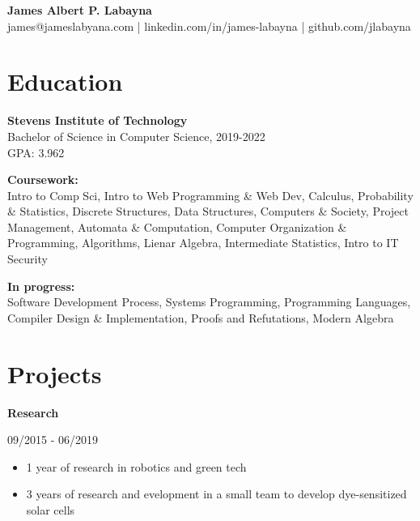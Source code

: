 \documentclass[11pt,letterpaper]{article}
\begin{document}
  \begin{center}
    \textbf{James Albert P. Labayna} \\
    \small james@jameslabyana.com | linkedin.com/in/james-labayna | github.com/jlabayna
  \end{center}
  
  \iffalse
  \begin{minipage}[t]{2in}
    \textbf{Present Address:} \\
    205 Hudson St, Apt. 602 \\
    Hoboken, NJ 07030 \\
    201.256.7526
  \end{minipage}
  \hfill
  \begin{minipage}[t]{2.4in}
    \textbf{Permanent Address:} \\
    294 S. Washington Ave., Apt. 87 \\
    Bergenfield, NJ 07030
  \end{minipage}
  \fi
  
  \section{Education}
    \textbf{Stevens Institute of Technology} \\
    Bachelor of Science in Computer Science, 2019-2022 \\
    GPA: 3.962
    
    \noindent\textbf{Coursework:}\\
    Intro to Comp Sci, Intro to Web Programming \& Web Dev, Calculus, Probability \& Statistics, Discrete Structures, Data Structures, Computers \& Society, Project Management, 
    Automata \& Computation, Computer Organization \& Programming, Algorithms, Lienar Algebra, Intermediate Statistics, Intro to IT Security

    \textbf{In progress:}\\
	Software Development Process, Systems Programming, Programming Languages, Compiler Design \& Implementation, Proofs and Refutations, Modern Algebra

  \section{Projects}
    \textbf{Research}\hfill
    \begin{minipage}[t]{1.2in}
      09/2015 - 06/2019
    \end{minipage}
    
      \begin{itemize}
        \item 1 year of research in robotics and green tech
        \item 3 years of research and evelopment in a small team to develop dye-sensitized solar cells
      \end{itemize}
    
\end{document}
